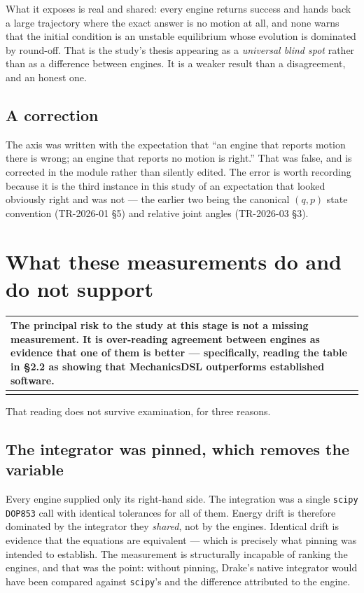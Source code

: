 \documentclass[11pt,a4paper]{article}
\makeatletter
\newenvironment{callout}
  {\par\medskip\noindent\begin{tabular}{@{}p{0.94\textwidth}@{}}
   \arrayrulecolor{warnrule}\hline\rule{0pt}{2.6ex}}
  {\\[0.8ex]\hline\arrayrulecolor{black}\end{tabular}\par\medskip}
\makeatother
\begin{document}
What it exposes is real and shared: every engine returns success and hands back
a large trajectory where the exact answer is no motion at all, and none warns
that the initial condition is an unstable equilibrium whose evolution is
dominated by round-off. That is the study's thesis appearing as a
\emph{universal blind spot} rather than as a difference between engines. It is
a weaker result than a disagreement, and an honest one.

\subsection{A correction}

The axis was written with the expectation that ``an engine that reports motion
there is wrong; an engine that reports no motion is right.'' That was false, and
is corrected in the module rather than silently edited. The error is worth
recording because it is the third instance in this study of an expectation that
looked obviously right and was not --- the earlier two being the canonical
$(q,p)$ state convention (TR-2026-01 \S5) and relative joint angles
(TR-2026-03 \S3).

\section{What these measurements do and do not support}\label{sec:interpretation}

\begin{callout}
The principal risk to the study at this stage is not a missing measurement. It
is over-reading agreement between engines as evidence that one of them is
better --- specifically, reading the table in \S2.2 as showing that
MechanicsDSL outperforms established software.
\end{callout}

\noindent That reading does not survive examination, for three reasons.

\subsection{The integrator was pinned, which removes the variable}

Every engine supplied only its right-hand side. The integration was a single
\texttt{scipy} \texttt{DOP853} call with identical tolerances for all of them.
Energy drift is therefore dominated by the integrator they \emph{shared}, not
by the engines. Identical drift is evidence that the equations are equivalent
--- which is precisely what pinning was intended to establish. The measurement
is structurally incapable of ranking the engines, and that was the point:
without pinning, Drake's native integrator would have been compared against
\texttt{scipy}'s and the difference attributed to the engine.
\end{document}
